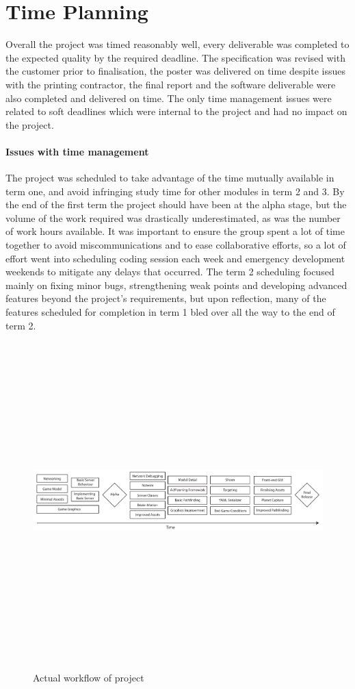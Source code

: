 \section{Time Planning}

Overall the project was timed reasonably well, every deliverable was completed to the expected quality by the required deadline. The specification was revised with the customer prior to finalisation, the poster was delivered on time despite issues with the printing contractor, the final report and the software deliverable were also completed and delivered on time. The only time management issues were related to soft deadlines which were internal to the project and had no impact on the project.

\paragraph{Issues with time management}
The project was scheduled to take advantage of the time mutually available in term one, and avoid infringing study time for other modules in term 2 and 3. 
By the end of the first term the project should have been at the alpha stage, but the volume of the work required was drastically underestimated, as was the number of work hours available. It was important to ensure the group spent a lot of time together to avoid miscommunications and to ease collaborative efforts, so a lot of effort went into scheduling coding session each week and emergency development weekends to mitigate any delays that occurred. The term 2 scheduling focused mainly on fixing minor bugs, strengthening weak points and developing advanced features beyond the project's requirements, but upon reflection, many of the features scheduled for completion in term 1 bled over all the way to the end of term 2. 

\begin{figure}
	\includegraphics[height=33em]{res/pm/actual_workflow_diagram}
	\label{fig:actual_workflow_diagram}
	\caption{Actual workflow of project}
\end{figure}

